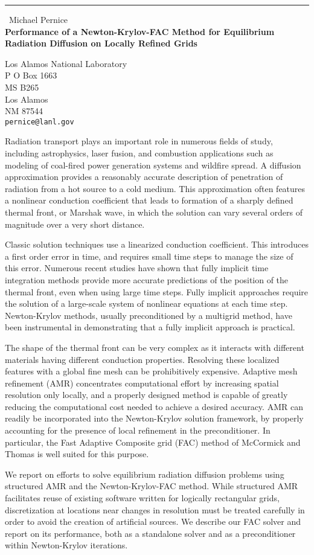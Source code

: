 \documentclass{report}
\begin{document}
\begin{center}
\rule{6in}{1pt} \
{\large Michael Pernice \\
{\bf Performance of a Newton-Krylov-FAC Method for Equilibrium Radiation Diffusion on Locally Refined Grids}}

Los Alamos National Laboratory \\ P O Box 1663 \\ MS B265 \\ Los Alamos \\ NM 87544
\\
{\tt pernice@lanl.gov}\end{center}

Radiation transport plays an important role in numerous fields of study,
including astrophysics, laser fusion, and combustion
applications such as modeling of coal-fired power generation systems and
wildfire spread. A diffusion approximation provides a reasonably accurate
description of penetration of radiation from a hot source to a cold
medium. This approximation often features a nonlinear conduction
coefficient that leads to formation of a sharply defined thermal front,
or Marshak wave, in which the solution can vary several orders of
magnitude over a very short distance.

Classic solution techniques use a linearized conduction coefficient. This
introduces a first order error in time, and requires small time steps to
manage the size of this error. Numerous recent studies have shown that
fully implicit time integration methods provide more accurate predictions
of the position of the thermal front, even when using large time steps.
Fully implicit approaches require the solution of a large-scale system of
nonlinear equations at each time step. Newton-Krylov methods, usually
preconditioned by a multigrid method, have been instrumental in
demonstrating that a fully implicit approach is practical.

The shape of the thermal front can be very complex as it interacts with
different materials having different conduction properties. Resolving
these localized features with a global fine mesh can be prohibitively
expensive. Adaptive mesh refinement (AMR) concentrates computational
effort by increasing spatial resolution only locally, and a properly
designed method is capable of greatly reducing the computational cost
needed to achieve a desired accuracy. AMR can readily be incorporated
into the Newton-Krylov solution framework, by properly accounting for the
presence of local refinement in the preconditioner. In particular, the
Fast Adaptive Composite grid (FAC) method of McCormick and Thomas is well
suited for this purpose.

We report on efforts to solve equilibrium radiation diffusion problems
using structured AMR and the Newton-Krylov-FAC method. While structured
AMR facilitates reuse of existing software written for logically
rectangular grids, discretization at locations near changes in resolution
must be treated carefully in order to avoid the creation of artificial
sources. We describe our FAC solver and report on its performance, both
as a standalone solver and as a preconditioner within Newton-Krylov
iterations.
\end{document}
